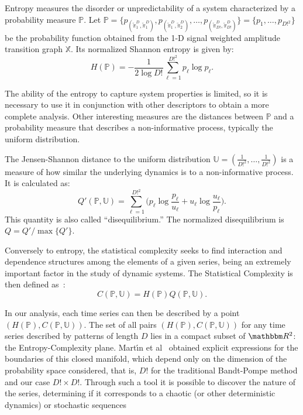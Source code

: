 \documentclass[journal]{IEEEtran}
\begin{document}
Entropy measures the disorder or unpredictability of a system characterized by a probability measure $\mathbb{P}$.
Let $\mathbb{P} = \{p_{(\widetilde\pi^D_1, \widetilde\pi^D_1)}, p_{(\widetilde\pi^D_1, \widetilde\pi^D_2)}, \dots, p_{(\widetilde\pi^D_{D!}, \widetilde\pi^D_{D!})} \} = \{p_1,\dots,p_{D!^2}\}$ be the probability function obtained from the 1-D signal weighted amplitude transition graph $\mathbb{X}$.
Its normalized Shannon entropy is given by:	
\begin{equation}
H(\mathbb{P}) = -\frac1{2\log D!}\sum_{\ell=1}^{D!^2} p_{\ell} \log p_{\ell} .
\label{eq:Entropia}
\end{equation}

The ability of the entropy to capture system properties is limited, so it is necessary to use it in conjunction with other des\-criptors to obtain a more complete analysis.
Other interesting measures are the distances between $\mathbb{P}$ and a probability measure that describes a non-informative process, typically the uniform distribution.

The Jensen-Shannon distance to the uniform distribution $\mathbb{U} = (\frac{1}{D!^2}, \dots, \frac{1}{D!^2})$ is a measure of how similar the underlying dynamics is to a non-informative process.
It is calculated as:
\begin{equation}
Q'(\mathbb{P}, \mathbb{U}) = \sum_{\ell=1}^{D!^2} \Big(p_\ell \log\frac{p_\ell}{u_\ell} +
u_\ell \log\frac{u_\ell}{p_\ell}
\Big).
\end{equation}
This quantity is also called ``disequilibrium.''
The normalized disequilibrium is $ Q=Q'/\max\{Q'\}$.

Conversely to entropy, the statistical complexity seeks to find interaction and dependence structures among the elements of a given series, being an extremely important factor in the study of dynamic systems.
The Statistical Complexity is then defined as~\cite{Lamberti2004Entropic}:
\begin{equation}
C(\mathbb{P}, \mathbb{U}) = H(\mathbb{P}) Q(\mathbb{P}, \mathbb{U}).
\end{equation}

In our analysis, each time series can then be described by a point $(H(\mathbb{P}), C(\mathbb{P}, \mathbb{U}))$.
The set of all pairs $(H(\mathbb{P}), C(\mathbb{P}, \mathbb{U}))$ for any time series described by patterns of length $D$ lies in a compact subset of $\mathbbm R^2$: the Entropy-Complexity plane.
Mart\'{\i}n et al~\cite{martin2006generalized} obtained explicit expressions for the boundaries of this closed manifold, which depend only on the dimension of the probability space considered, that is, $D!$ for the traditional Bandt-Pompe method and our case $D! \times D!$.
Through such a tool it is possible to discover the nature of the series, determining if it corresponds to a chaotic (or other deterministic dynamics) or stochastic sequences
\end{document}
